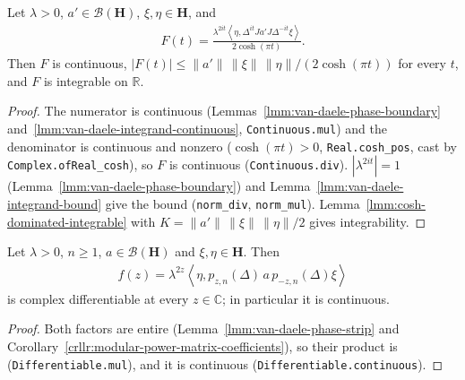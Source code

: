 \begin{lemma}
    \label{lmm:van-daele-integrand-integrable}
    \leanok
    Let $\lambda > 0$, $a' \in \mathcal{B}(\mathbf{H})$, $\xi, \eta \in \mathbf{H}$, and
    \begin{align}
        F(t) = \frac{\lambda^{2it}\left< \eta, \Delta^{it}Ja'J\Delta^{-it}\xi \right>}{2\cosh(\pi t)}.
    \end{align}
    Then $F$ is continuous, $|F(t)| \le \|a'\|\,\|\xi\|\,\|\eta\| / (2\cosh(\pi t))$ for every $t$, and $F$ is integrable on $\mathbb{R}$.
\end{lemma}
\begin{proof}
    \leanok
    The numerator is continuous (Lemmas~\ref{lmm:van-daele-phase-boundary} and~\ref{lmm:van-daele-integrand-continuous}, \texttt{Continuous.mul}) and the denominator is continuous and nonzero ($\cosh(\pi t) > 0$, \texttt{Real.cosh\_pos}, cast by \texttt{Complex.ofReal\_cosh}), so $F$ is continuous (\texttt{Continuous.div}). $|\lambda^{2it}| = 1$ (Lemma~\ref{lmm:van-daele-phase-boundary}) and Lemma~\ref{lmm:van-daele-integrand-bound} give the bound (\texttt{norm\_div}, \texttt{norm\_mul}). Lemma~\ref{lmm:cosh-dominated-integrable} with $K = \|a'\|\,\|\xi\|\,\|\eta\|/2$ gives integrability.
\end{proof}

\begin{lemma}
    \label{lmm:van-daele-strip-function-entire}
    \leanok
    Let $\lambda > 0$, $n \ge 1$, $a \in \mathcal{B}(\mathbf{H})$ and $\xi, \eta \in \mathbf{H}$. Then
    \begin{align}
        f(z) = \lambda^{2z}\left< \eta, p_{z,n}(\Delta)\,a\,p_{-z,n}(\Delta)\xi \right>
    \end{align}
    is complex differentiable at every $z \in \mathbb{C}$; in particular it is continuous.
\end{lemma}
\begin{proof}
    \leanok
    Both factors are entire (Lemma~\ref{lmm:van-daele-phase-strip} and Corollary~\ref{crllr:modular-power-matrix-coefficients}), so their product is (\texttt{Differentiable.mul}), and it is continuous (\texttt{Differentiable.continuous}).
\end{proof}

